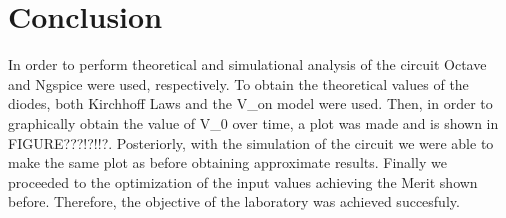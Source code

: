 
\section{Conclusion}
\label{sec:conclusion}


In order to perform theoretical and simulational analysis of the circuit Octave and Ngspice were used, respectively.
To obtain the theoretical values of the diodes, both Kirchhoff Laws and the V_on model were used. Then, in order to graphically obtain the value of V_0 over time, a plot was made and is shown in FIGURE???!?!!?.
Posteriorly, with the simulation of the circuit we were able to make the same plot as before obtaining approximate results.
Finally we proceeded to the optimization of the input values achieving the Merit shown before.
Therefore, the objective of the laboratory was achieved succesfuly.

